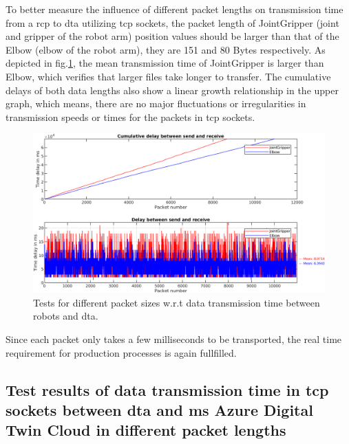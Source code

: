 To better measure the influence of different packet lengths on transmission time from 
a \gls{rcp} to \gls{dta} utilizing 
\gls{tcp} sockets, 
the packet length of JointGripper (joint and gripper of the robot arm) position values should 
be larger than that of the Elbow (elbow of the robot arm), they are 151 and 80 Bytes respectively. 
As depicted in 
fig.\ref{fig: SR-JointGripper-Elbow}, the mean transmission time of JointGripper is larger 
than Elbow, which verifies that larger files take longer to transfer. The cumulative delays of 
both data lengths also show a linear growth relationship 
in the upper graph, which means, there are no major fluctuations or irregularities 
in transmission speeds or times for the packets in \gls{tcp} sockets. 


\begin{figure}[htb]
    \includegraphics[width=\textwidth]{figures/tests/DT/Delay_SendReceive_JointGripper_Elbow.png}
    \centering
    \caption{Tests for different packet sizes w.r.t data transmission time between robots 
    and \gls{dta}. \label{fig: SR-JointGripper-Elbow}}
\end{figure}

Since each packet only takes a few milliseconds to be transported, the real time requirement 
for production processes is again fullfilled. 



\subsection{Test results of data transmission time in \gls{tcp} sockets between \gls{dta} 
and \gls{ms} Azure Digital Twin Cloud in different packet lengths} \label{chap: Result-DTA-DT}

